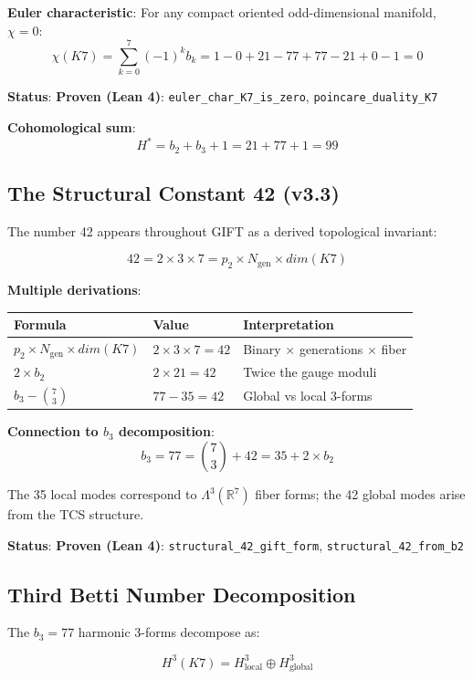 \documentclass[11pt,a4paper]{article}
\newcommand{\Kseven}{K_7}
\newcommand{\dimE}{\mathrm{dim}}
\newcommand{\proven}{\textsc{Proven}}
\def\Kseven{K7}%
\def\dimE{dim}%
\def\proven{Proven}%
\begin{document}
\textbf{Euler characteristic}: For any compact oriented odd-dimensional manifold, $\chi = 0$:
$$\chi(\Kseven) = \sum_{k=0}^{7} (-1)^k b_k = 1 - 0 + 21 - 77 + 77 - 21 + 0 - 1 = 0$$

\textbf{Status}: \textbf{\proven{} (Lean 4)}: \texttt{euler\_char\_K7\_is\_zero}, \texttt{poincare\_duality\_K7}

\textbf{Cohomological sum}:
$$H^* = b_2 + b_3 + 1 = 21 + 77 + 1 = 99$$

\subsection{The Structural Constant 42 (v3.3)}

The number 42 appears throughout GIFT as a derived topological invariant:

$$42 = 2 \times 3 \times 7 = p_2 \times N_{\mathrm{gen}} \times \dimE(\Kseven)$$

\textbf{Multiple derivations}:

\begin{table}[H]
\centering
\begin{tabular}{lll}
\toprule
Formula & Value & Interpretation \\
\midrule
$p_2 \times N_{\mathrm{gen}} \times \dimE(\Kseven)$ & $2 \times 3 \times 7 = 42$ & Binary $\times$ generations $\times$ fiber \\
$2 \times b_2$ & $2 \times 21 = 42$ & Twice the gauge moduli \\
$b_3 - \binom{7}{3}$ & $77 - 35 = 42$ & Global vs local 3-forms \\
\bottomrule
\end{tabular}
\end{table}

\textbf{Connection to $b_3$ decomposition}:
$$b_3 = 77 = \binom{7}{3} + 42 = 35 + 2 \times b_2$$

The 35 local modes correspond to $\Lambda^3(\mathbb{R}^7)$ fiber forms; the 42 global modes arise from the TCS structure.

\textbf{Status}: \textbf{\proven{} (Lean 4)}: \texttt{structural\_42\_gift\_form}, \texttt{structural\_42\_from\_b2}

\subsection{Third Betti Number Decomposition}

The $b_3 = 77$ harmonic 3-forms decompose as:

$$H^3(\Kseven) = H^3_{\text{local}} \oplus H^3_{\text{global}}$$
\end{document}
